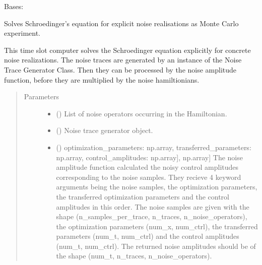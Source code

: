 \documentclass[letterpaper,10pt,english]{sphinxmanual}
\begin{document}
\begin{fulllineitems}
Bases: {\hyperref[\detokenize{qsim:qsim.solver_algorithms.SchroedingerSolver}]{}}

Solves Schroedinger’s equation for explicit noise realisations as Monte
Carlo experiment.

This time slot computer solves the Schroedinger equation explicitly for
concrete noise realizations. The noise traces are generated by an instance
of the Noise Trace Generator Class. Then they can be processed by the
noise amplitude function, before they are multiplied by the noise
hamiltionians.
\begin{quote}\begin{description}
\item[{Parameters}] \leavevmode\begin{itemize}
\item {} 
 (\sphinxstyleliteralemphasis{\sphinxupquote{{[}}}\sphinxstyleliteralemphasis{\sphinxupquote{{]}}}\sphinxstyleliteralemphasis{\sphinxupquote{, }}) \textendash{} List of noise operators occurring in the Hamiltonian.

\item {} 
 ({\hyperref[\detokenize{qsim:qsim.noise.NoiseTraceGenerator}]{}}) \textendash{} Noise trace generator object.

\item {} 
 (\sphinxstyleliteralemphasis{\sphinxupquote{{[}}}\sphinxstyleliteralemphasis{\sphinxupquote{{[}}}\sphinxstyleliteralemphasis{\sphinxupquote{,}}) \textendash{} optimization\_parameters: np.array,
transferred\_parameters: np.array,
control\_amplitudes: np.array{]}, np.array{]}
The noise amplitude function calculated the noisy control amplitudes
corresponding to the noise samples. They recieve 4 keyword arguments
being the noise samples, the optimization parameters, the transferred
optimization parameters and the control amplitudes in this order.
The noise samples are given with the shape (n\_samples\_per\_trace,
n\_traces, n\_noise\_operators), the optimization parameters
(num\_x, num\_ctrl), the transferred parameters (num\_t, num\_ctrl) and
the control amplitudes (num\_t, num\_ctrl). The returned noise amplitudes
should be of the shape (num\_t, n\_traces, n\_noise\_operators).


\end{itemize}
\end{description}
\end{quote}
\end{fulllineitems}
\end{document}
